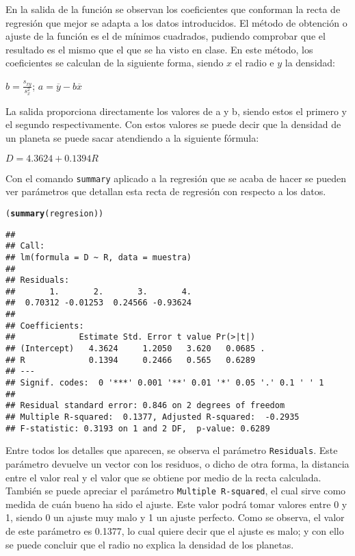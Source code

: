 \documentclass[12pt]{report}\usepackage[]{graphicx}\usepackage[dvipsnames]{xcolor}
\makeatletter
\newcommand{\hlstd}[1]{\textcolor[rgb]{0.345,0.345,0.345}{#1}}%
\newcommand{\hlkwd}[1]{\textcolor[rgb]{0.737,0.353,0.396}{\textbf{#1}}}%
\newenvironment{kframe}{%
 \def\at@end@of@kframe{}%
 \ifinner\ifhmode%
  \def\at@end@of@kframe{\end{minipage}}%
  \begin{minipage}{\columnwidth}%
 \fi\fi%
 \def\FrameCommand##1{\hskip\@totalleftmargin \hskip-\fboxsep
 \colorbox{shadecolor}{##1}\hskip-\fboxsep
     \hskip-\linewidth \hskip-\@totalleftmargin \hskip\columnwidth}%
 \MakeFramed {\advance\hsize-\width
   \@totalleftmargin\z@ \linewidth\hsize
   \@setminipage}}%
 {\par\unskip\endMakeFramed%
 \at@end@of@kframe}
\newenvironment{knitrout}{}{} %
\makeatother
\begin{document}
	En la salida de la función se observan los coeficientes que conforman la recta de regresión que mejor se adapta a los datos introducidos. El método de obtención o ajuste de la función es el de mínimos cuadrados, pudiendo comprobar que el resultado es el mismo que el que se ha visto en clase. En este método, los coeficientes se calculan de la siguiente forma, siendo $x$ el radio e $y$ la densidad:
	
	\begin{center}
		$b = \frac{s_{xy}}{s^{2}_x}$;
		$a = \overline{y} -b\overline{x}$
	\end{center}
	 
	 La salida proporciona directamente los valores de a y b, siendo estos el primero y el segundo respectivamente. Con estos valores se puede decir que la densidad de un planeta se puede sacar atendiendo a la siguiente fórmula:
	 
	 \begin{center}
	 	$D = 4.3624 + 0.1394R$
	 \end{center}
	 
	 Con el comando \texttt{summary} aplicado a la regresión que se acaba de hacer se pueden ver parámetros que detallan esta recta de regresión con respecto a los datos.
	 
\begin{knitrout}
\color{fgcolor}\begin{kframe}
\begin{alltt}
\hlstd{(}\hlkwd{summary}\hlstd{(regresion))}
\end{alltt}
\begin{verbatim}
## 
## Call:
## lm(formula = D ~ R, data = muestra)
## 
## Residuals:
##       1.       2.       3.       4. 
##  0.70312 -0.01253  0.24566 -0.93624 
## 
## Coefficients:
##             Estimate Std. Error t value Pr(>|t|)  
## (Intercept)   4.3624     1.2050   3.620   0.0685 .
## R             0.1394     0.2466   0.565   0.6289  
## ---
## Signif. codes:  0 '***' 0.001 '**' 0.01 '*' 0.05 '.' 0.1 ' ' 1
## 
## Residual standard error: 0.846 on 2 degrees of freedom
## Multiple R-squared:  0.1377,	Adjusted R-squared:  -0.2935 
## F-statistic: 0.3193 on 1 and 2 DF,  p-value: 0.6289
\end{verbatim}
\end{kframe}
\end{knitrout}
	 
	 Entre todos los detalles que aparecen, se observa el parámetro \texttt{Residuals}. Este parámetro devuelve un vector con los residuos, o dicho de otra forma, la distancia entre el valor real y el valor que se obtiene por medio de la recta calculada. También se puede apreciar el parámetro \texttt{Multiple R-squared}, el cual sirve como medida de cuán bueno ha sido el ajuste. Este valor podrá tomar valores entre 0 y 1, siendo 0 un ajuste muy malo y 1 un ajuste perfecto. Como se observa, el valor de este parámetro es 0.1377, lo cual quiere decir que el ajuste es malo; y con ello se puede concluir que el radio no explica la densidad de los planetas.\\
	 
\end{document}
